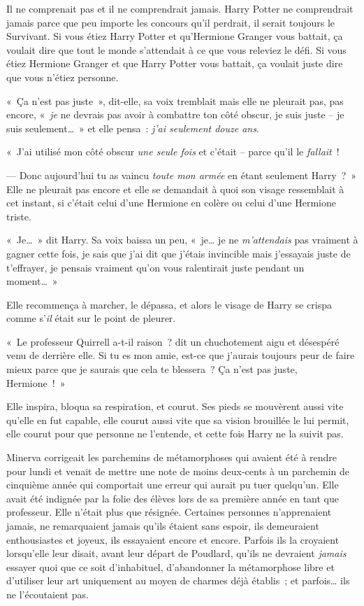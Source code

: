 Il ne comprenait pas et il ne comprendrait jamais.
Harry Potter ne comprendrait jamais parce que peu importe les concours qu'il perdrait, il serait toujours le Survivant.
Si vous étiez Harry Potter et qu'Hermione Granger vous battait, ça voulait dire que tout le monde s'attendait à ce que vous releviez le défi.
Si vous étiez Hermione Granger et que Harry Potter vous battait, ça voulait juste dire que vous n'étiez personne.

«~Ça n'est pas juste~», dit-elle, sa voix tremblait mais elle ne pleurait pas, pas encore, «~\emph{je} ne devrais pas avoir à combattre ton côté obscur, je suis juste -- je suis seulement…~»
et elle pensa~: \emph{j'ai seulement douze ans}.

«~J'ai utilisé mon côté obscur \emph{une seule fois} et c'était -- parce qu'il le \emph{fallait}~!

--- Donc aujourd'hui tu as vaincu \emph{toute mon armée} en étant seulement Harry~?~»
Elle ne pleurait pas encore et elle se demandait à quoi son visage ressemblait à cet instant, si c'était celui d'une Hermione en colère ou celui d'une Hermione triste.

«~Je…~» dit Harry.
Sa voix baissa un peu, «~je… je ne \emph{m'attendais} pas vraiment à gagner cette fois, je sais que j'ai dit que j'étais invincible mais j'essayais juste de t'effrayer, je pensais vraiment qu'on vous ralentirait juste pendant un moment…~»

Elle recommença à marcher, le dépassa, et alors le visage de Harry se crispa comme s'\emph{il} était sur le point de pleurer.

«~Le professeur Quirrell a-t-il raison~? dit un chuchotement aigu et désespéré venu de derrière elle.
Si tu es mon amie, est-ce que j'aurais toujours peur de faire mieux parce que je saurais que cela te blessera~?
Ça n'est pas juste, Hermione~!~»

Elle inspira, bloqua sa respiration, et courut.
Ses pieds se mouvèrent aussi vite qu'elle en fut capable, elle courut aussi vite que sa vision brouillée le lui permit, elle courut pour que personne ne l'entende, et cette fois Harry ne la suivit pas.

\later

Minerva corrigeait les parchemins de métamorphoses qui avaient été à rendre pour lundi et venait de mettre une note de moins deux-cents à un parchemin de cinquième année qui comportait une erreur qui aurait pu tuer quelqu'un.
Elle avait été indignée par la folie des élèves lors de sa première année en tant que professeur.
Elle n'était plus que résignée.
Certaines personnes n'apprenaient jamais, ne remarquaient jamais qu'ils étaient sans espoir, ils demeuraient enthousiastes et joyeux, ils essayaient encore et encore.
Parfois ils la croyaient lorsqu'elle leur disait, avant leur départ de Poudlard, qu'ils ne devraient \emph{jamais} essayer quoi que ce soit d'inhabituel, d'abandonner la métamorphose libre et d'utiliser leur art uniquement au moyen de charmes déjà établis~; et parfois… ils ne l'écoutaient pas.

